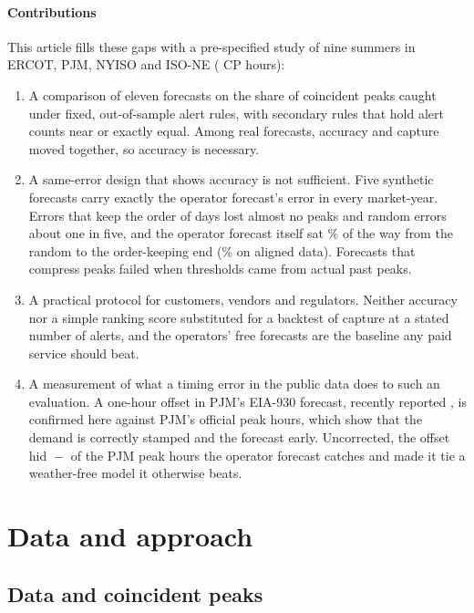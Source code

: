 \documentclass[preprint,12pt,authoryear]{elsarticle}
\begin{document}
\paragraph{Contributions} This article fills these gaps with a pre-specified study of nine summers in ERCOT, PJM, NYISO and ISO-NE ( CP hours):
\begin{enumerate}
\item A comparison of eleven forecasts on the share of coincident peaks caught under fixed, out-of-sample alert rules, with secondary rules that hold alert counts near or exactly equal. Among real forecasts, accuracy and capture moved together, so accuracy is necessary.
\item A same-error design that shows accuracy is not sufficient. Five synthetic forecasts carry exactly the operator forecast's error in every market-year. Errors that keep the order of days lost almost no peaks and random errors about one in five, and the operator forecast itself sat \% of the way from the random to the order-keeping end (\% on aligned data). Forecasts that compress peaks failed when thresholds came from actual past peaks.
\item A practical protocol for customers, vendors and regulators. Neither accuracy nor a simple ranking score substituted for a backtest of capture at a stated number of alerts, and the operators' free forecasts are the baseline any paid service should beat.
\item A measurement of what a timing error in the public data does to such an evaluation. A one-hour offset in PJM's EIA-930 forecast, recently reported \citep{guerrafilho2026scorecard,nguyen2026eia930}, is confirmed here against PJM's official peak hours, which show that the demand is correctly stamped and the forecast early. Uncorrected, the offset hid ${}-{}$ of the  PJM peak hours the operator forecast catches and made it tie a weather-free model it otherwise beats.
\end{enumerate}

\section{Data and approach}

\subsection{Data and coincident peaks}
\end{document}
